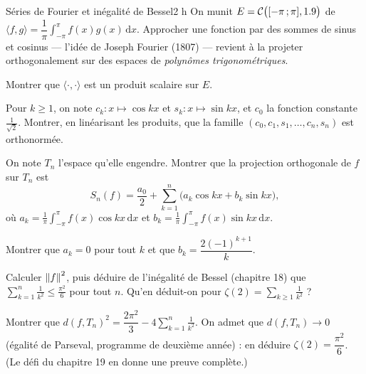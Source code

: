 

\begin{defi}{Séries de Fourier et inégalité de Bessel}{2 h}
On munit $E=\mathcal{C}\bigl(\mathopen{[}-\pi\,{;}\,\pi\mathclose{]},1.9\bigr)$ de
$\langle f,g\rangle=\dfrac1\pi\displaystyle\int_{-\pi}^{\pi}f(x)g(x)\,\mathrm{d}x$.
Approcher une fonction par des sommes de sinus et cosinus — l'idée de
Joseph Fourier (1807) — revient à la projeter orthogonalement sur des
espaces de \emph{polynômes trigonométriques}.

\begin{questions}
  \item Montrer que $\langle\cdot,\cdot\rangle$ est un produit scalaire sur
    $E$.
  \item Pour $k\geqslant1$, on note $c_k:x\mapsto\cos kx$ et
    $s_k:x\mapsto\sin kx$, et $c_0$ la fonction constante
    $\frac{1}{\sqrt2}$. Montrer, en linéarisant les produits, que la
    famille $(c_0,c_1,s_1,\dots,c_n,s_n)$ est orthonormée.
  \item On note $T_n$ l'espace qu'elle engendre. Montrer que la projection
    orthogonale de $f$ sur $T_n$ est
    \[
    S_n(f)=\frac{a_0}{2}+\sum_{k=1}^{n}\bigl(a_k\cos kx+b_k\sin kx\bigr),
    \]
    où
    $a_k=\frac1\pi\int_{-\pi}^{\pi}f(x)\cos kx\,\mathrm{d}x$ et
    $b_k=\frac1\pi\int_{-\pi}^{\pi}f(x)\sin kx\,\mathrm{d}x$.
\end{questions}

\begin{questions}[resume]
  \item Montrer que $a_k=0$ pour tout $k$ et que
    $b_k=\dfrac{2(-1)^{k+1}}{k}$.
  \item Calculer $\left\lVert f\right\rVert^{2}$, puis déduire de l'inégalité de Bessel
    (chapitre 18) que
    $\displaystyle\sum_{k=1}^{n}\frac{1}{k^{2}}\leqslant\frac{\pi^{2}}{6}$
    pour tout $n$. Qu'en déduit-on pour
    $\zeta(2)=\sum_{k\geqslant1}\frac{1}{k^{2}}$ ?
  \item Montrer que
    $d(f,T_n)^{2}=\dfrac{2\pi^{2}}{3}-4\displaystyle\sum_{k=1}^{n}\frac{1}{k^{2}}$.
    On admet que $d(f,T_n)\to0$ (égalité de Parseval, programme de deuxième
    année) : en déduire $\zeta(2)=\dfrac{\pi^{2}}{6}$. (Le défi du
    chapitre 19 en donne une preuve complète.)
\end{questions}


\end{defi}
